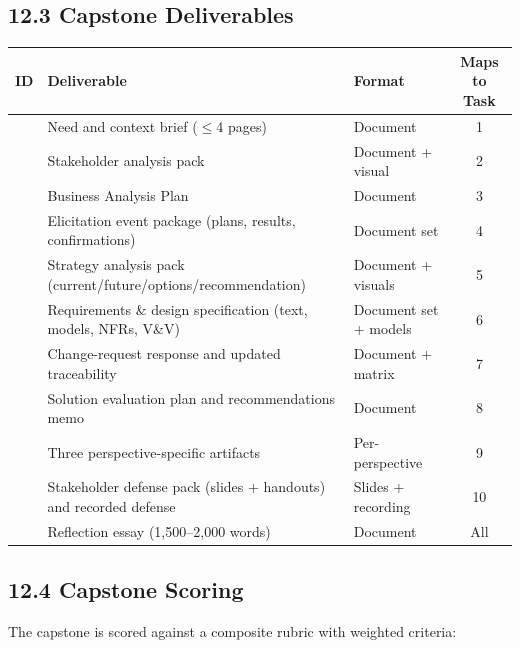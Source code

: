 \documentclass[11pt,letterpaper,oneside]{report}
\begin{document}
\subsection*{12.3 Capstone Deliverables}

\begin{tcolorbox}[callout,colback=afpaper,colframe=afnavy,colbacktitle=afnavy,title=Required Capstone Deliverables (C-01 to C-11)]
\begin{tabular}{@{}R{1.0cm} R{6.4cm} R{4.6cm} c@{}}
\toprule
\sffamily\bfseries ID & \sffamily\bfseries Deliverable & \sffamily\bfseries Format & \sffamily\bfseries Maps to Task \\
\midrule
{} & Need and context brief ($\leq$4 pages)                                  & Document             & 1  \\
 & Stakeholder analysis pack                                                & Document + visual    & 2  \\
 & Business Analysis Plan                                                   & Document             & 3  \\
 & Elicitation event package (plans, results, confirmations)                & Document set         & 4  \\
 & Strategy analysis pack (current/future/options/recommendation)           & Document + visuals   & 5  \\
 & Requirements \& design specification (text, models, NFRs, V\&V)          & Document set + models& 6  \\
 & Change-request response and updated traceability                         & Document + matrix    & 7  \\
 & Solution evaluation plan and recommendations memo                        & Document             & 8  \\
 & Three perspective-specific artifacts                                     & Per-perspective      & 9  \\
 & Stakeholder defense pack (slides + handouts) and recorded defense        & Slides + recording   & 10 \\
 & Reflection essay (1{,}500--2{,}000 words)                                & Document             & All\\
\bottomrule
\end{tabular}
\end{tcolorbox}

\subsection*{12.4 Capstone Scoring}
The capstone is scored against a composite rubric  with weighted criteria:
\end{document}
